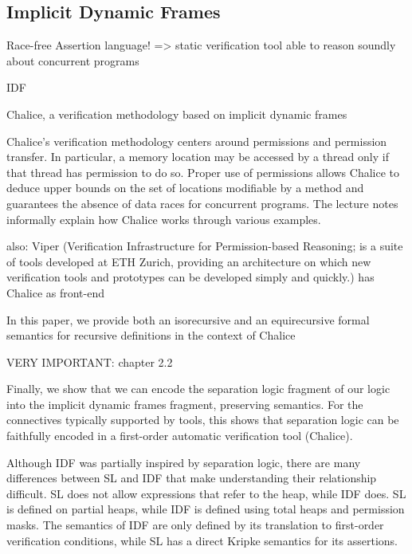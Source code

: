 \subsection{Implicit Dynamic Frames}

Race-free Assertion language! => static verification tool able to reason soundly about concurrent programs


\cite{smans2009implicit}
IDF


\cite{leino2009verification}
Chalice, a verification methodology based on implicit dynamic frames

Chalice’s verification methodology centers around permissions and permission transfer. In particular, a memory location may be accessed by a thread only if that thread has permission to do so. Proper use of permissions allows Chalice to deduce upper bounds on the set of locations modifiable by a method and guarantees the absence of data races for concurrent programs. The lecture notes informally explain how Chalice works through various examples.

also: Viper (Verification Infrastructure for Permission-based Reasoning; is a suite of tools developed at ETH Zurich, providing an architecture on which new verification tools and prototypes can be developed simply and quickly.) has Chalice as front-end

\cite{summers2013formal}
In this paper, we provide both an isorecursive and an equirecursive formal
semantics for recursive definitions in the context of Chalice

\cite{parkinson2011relationship}
VERY IMPORTANT: chapter 2.2

Finally, we show that we can encode the separation
logic fragment of our logic into the implicit dynamic frames fragment, preserving
semantics. For the connectives typically supported by tools, this shows that separation
logic can be faithfully encoded in a first-order automatic verification tool (Chalice).

Although IDF was partially inspired by separation logic, there are many differences
between SL and IDF that make understanding their relationship difficult. SL does not
allow expressions that refer to the heap, while IDF does. SL is defined on partial heaps,
while IDF is defined using total heaps and permission masks. The semantics of IDF are only defined by its translation to first-order verification conditions, while SL has a direct
Kripke semantics for its assertions.


